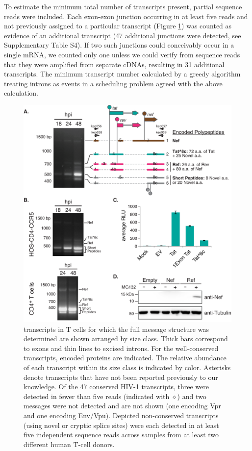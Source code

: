 \documentclass[../sherrill-Mix_thesis.tex]{subfiles}
\begin{document}
To estimate the minimum total number of transcripts present, partial sequence reads were included. Each exon-exon junction occurring in at least five reads and not previously assigned to a particular transcript (Figure \ref{figTranscripts}) was counted as evidence of an additional transcript (47 additional junctions were detected, see Supplementary Table S4). If two such junctions could conceivably occur in a single mRNA, we counted only one unless we could verify from sequence reads that they were amplified from separate cDNAs, resulting in 31 additional transcripts. The minimum transcript number calculated by a greedy algorithm treating introns as events in a scheduling problem agreed with the above calculation. 

\begin{figure}
	\centering
	\includegraphics[width=.9\textwidth]{3.pdf}
	\caption[Spliced transcripts produced from \hivEight{}]{\hivEight{} transcripts in T cells for which the full message structure was determined are shown arranged by size class. Thick bars correspond to exons and thin lines to excised introns. For the well-conserved transcripts, encoded proteins are indicated. The relative abundance of each transcript within its size class is indicated by color. Asterisks denote transcripts that have not been reported previously to our knowledge. Of the 47 conserved HIV-1 transcripts, three were detected in fewer than five reads (indicated with $\diamond$) and two messages were not detected and are not shown (one encoding Vpr and one encoding Env/Vpu). Depicted non-conserved transcripts (using novel or cryptic splice sites) were each detected in at least five independent sequence reads across samples from at least two different human T-cell donors.}
	\label{figTranscripts}
\end{figure}
\end{document}
